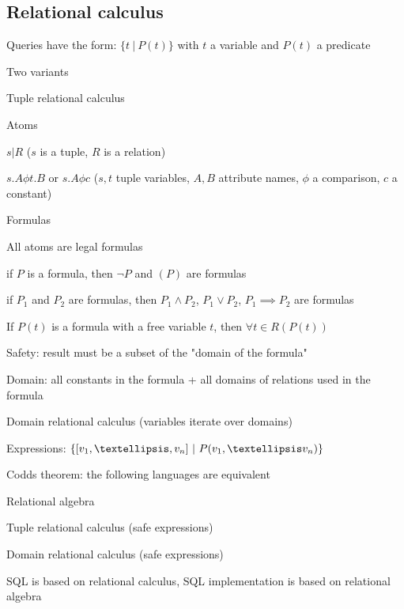 \subsection{Relational calculus}
\enumstart
	\item Queries have the form: $\{t \ | \ P(t)\}$ with $t$ a variable and $P(t)$ a predicate
	\item Two variants
	\enumstart
		\item Tuple relational calculus
		 \enumstart
		 	\item Atoms
		 	\enumstart
		 		\item $s | R$ ($s$ is a tuple, $R$ is a relation)
		 		\item $s.A \phi t.B$ or $s.A \phi c$ ($s,t$ tuple variables, $A,B$ attribute names, $\phi$ a comparison, $c$ a constant)
		 	\enumend
		 	\item Formulas
		 	\enumstart
		 		\item All atoms are legal formulas
		 		\item if $P$ is a formula, then $\lnot P$ and $(P)$ are formulas
		 		\item if $P_1$ and $P_2$ are formulas, then $P_1 \land P_2$, $P_1 \lor P_2$, $P_1 \implies P_2$ are formulas
		 		\item If $P(t)$ is a formula with a free variable $t$, then $\forall t \in R(P(t))$
		 	\enumend
		 	\item Safety: result must be a subset of the "domain of the formula"
		 	\item Domain: all constants in the formula + all domains of relations used in the formula
		 \enumend
		\item Domain relational calculus (variables iterate over domains)
		\enumstart
			\item Expressions: $\{[v_1, \ddd, v_n] \ | \ P(v_1, \ddd v_n)\}$
		\enumend
		\item Codds theorem: the following languages are equivalent
		\enumstart
			\item Relational algebra
			\item Tuple relational calculus (safe expressions)
			\item Domain relational calculus (safe expressions)
		\enumend
		\item \arrow SQL is based on relational calculus, SQL implementation is based on relational algebra
	\enumend
\enumend
